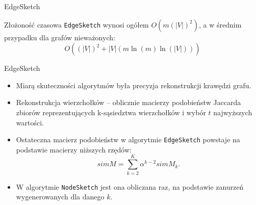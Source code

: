 \begin{frame}[squeeze]{EdgeSketch}
    \small
    \begin{algorithm}[H]
        \caption{EdgeSketch($\tilde{A},m$)}\label{alg:edge_sketch}
    \end{algorithm}

    \begin{lemat}
        Złożoność czasowa \texttt{EdgeSketch} wynosi ogółem $O(m(|V|)^2)$, a w średnim przypadku dla grafów nieważonych:
        \[
            O((|V|)^2 + |V|(m \ln(m) \ln(|V|)))
        \]
    \end{lemat}
\end{frame}

\begin{frame}[squeeze]{EdgeSketch}
    \begin{itemize}
        \item Miarą skuteczności algorytmów była precyzja rekonstrukcji krawędzi grafu. 
        \item Rekonstrukcja wierzchołków -- oblicznie macierzy podobieństw Jaccarda zbiorów reprezentujących k-sąsiedztwa wierzchołków i wybór $t$ najwyższych wartości.
        \item Ostateczna macierz podobieństw w algorytmie \texttt{EdgeSketch} powstaje na podstawie macierzy niższych rzędów:
        \[
            simM = \sum\limits_{k = 2}^{K} \alpha^{k-2} simM_{k}.
        \]
        \item W algorytmie \texttt{NodeSketch} jest ona obliczana raz, na podstawie zanurzeń wygenerowanych dla danego $k$.  
    \end{itemize}
\end{frame}